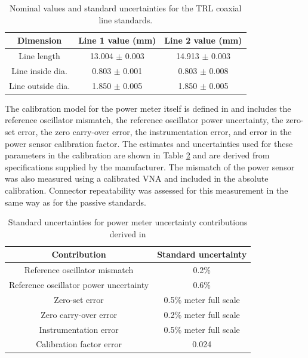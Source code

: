 \documentclass[../thesis/thesis.tex]{subfiles}
\begin{document}
\begin{refsection}
\begin{table}[]
	\centering
	\caption{Nominal values and standard uncertainties for the TRL coaxial line standards.}
	\label{ch5_table_passivestds}
	\begin{tabular}{ccc}
		\hline
		Dimension         & Line 1 value (mm) & Line 2 value (mm) \\ \hline
		Line length       & 13.004 $\pm$ 0.003 & 14.913 $\pm$ 0.003 \\
		Line inside dia.  & 0.803 $\pm$ 0.001 & 0.803 $\pm$ 0.008 \\
		Line outside dia. & 1.850 $\pm$ 0.005 & 1.850 $\pm$ 0.005 \\ \hline            
	\end{tabular}
\end{table}

The calibration model for the power meter itself is defined in \cite{Keysight_2017} and includes the reference oscillator mismatch, the reference oscillator power uncertainty, the zero-set error, the zero carry-over error, the instrumentation error, and error in the power sensor calibration factor. The estimates and uncertainties used for these parameters in the calibration are shown in Table \ref{ch5_table_powerunc} and are derived from specifications supplied by the manufacturer. The mismatch of the power sensor was also measured using a calibrated VNA and included in the absolute calibration. Connector repeatability was assessed for this measurement in the same way as for the passive standards.

\begin{table}[]
	\centering
	\caption{Standard uncertainties for power meter uncertainty contributions derived in \cite{Keysight_2017}}
	\label{ch5_table_powerunc}
	\begin{tabular}{cc}
		\hline
		Contribution                           & Standard uncertainty \\ \hline
		Reference oscillator mismatch          & 0.2\%                \\
		Reference oscillator power uncertainty & 0.6\%                \\
		Zero-set error                         & 0.5\% meter full scale \\
		Zero carry-over error                  & 0.2\% meter full scale \\
		Instrumentation error                  & 0.5\% meter full scale \\
		Calibration factor error               & 0.024               \\ \hline
	\end{tabular}
\end{table}


\end{refsection}
\end{document}

